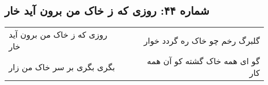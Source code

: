 \begin{center}
\section*{شماره ۴۴: روزی که ز خاک من برون آید خار}
\label{sec:044}
\begin{longtable}{l p{0.5cm} r}
روزی که ز خاک من برون آید خار
&&
گلبرگ رخم چو خاک ره گردد خوار
\\
بگری بگری بر سر خاک من زار
&&
گو ای همه خاک گشته کو آن همه کار
\\
\end{longtable}
\end{center}
